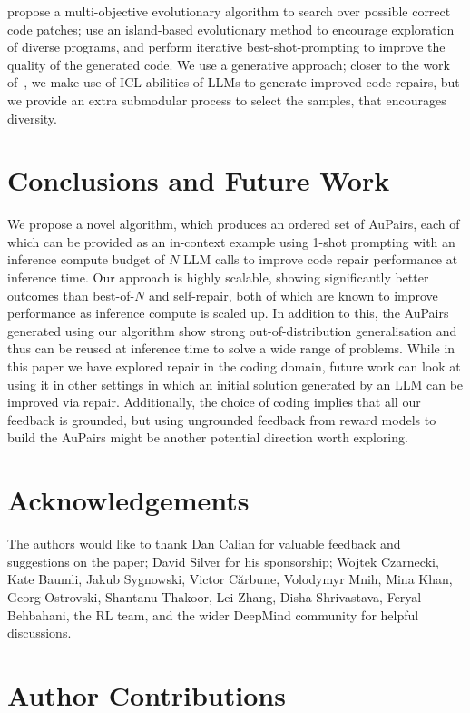 \documentclass[11pt, a4paper, logo, copyright]{googledeepmind}
\def\aupairs/{\textcolor{golden}{Au}Pairs}
\begin{document}
\citet{yuan2017arja} propose a multi-objective evolutionary algorithm to search over possible correct code patches; \citet{paredes2023funsearch} use an island-based evolutionary method to encourage exploration of diverse programs, and perform iterative best-shot-prompting to improve the quality of the generated code. We use a generative approach; closer to the work of~\citet{shirafuji2023fewshot}, we make use of ICL abilities of LLMs to generate improved code repairs, but we provide an extra submodular process to select the samples, that encourages diversity.



\section{Conclusions and Future Work}
\label{sec:conclusions}
We propose a novel algorithm, which produces an ordered set of \aupairs/, each of which can be provided as an in-context example using 1-shot prompting with an inference compute budget of $N$ LLM calls to improve code repair performance at inference time. Our approach is highly scalable, showing significantly better outcomes than best-of-$N$ and self-repair, both of which are known to improve performance as inference compute is scaled up. In addition to this, the \aupairs/ generated using our algorithm show strong out-of-distribution generalisation and thus can be reused at inference time to solve a wide range of problems. While in this paper we have explored repair in the coding domain, future work can look at using it in other settings in which an initial solution generated by an LLM can be improved via repair. Additionally, the choice of coding implies that all our feedback is grounded, but using ungrounded feedback from reward models to build the \aupairs/ might be another potential direction worth exploring.


\section{Acknowledgements}

The authors would like to thank Dan Calian for valuable feedback and suggestions on the paper; David Silver for his sponsorship; Wojtek Czarnecki, Kate Baumli, Jakub Sygnowski, Victor C\u{a}rbune, Volodymyr Mnih, Mina Khan, Georg Ostrovski, Shantanu Thakoor, Lei Zhang, Disha Shrivastava, Feryal Behbahani, the RL team, and the wider DeepMind community for helpful discussions.

\section{Author Contributions}
\end{document}
